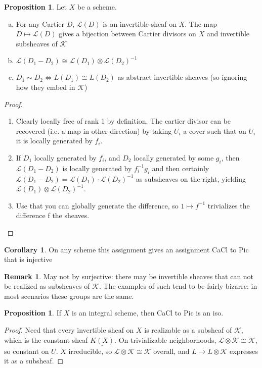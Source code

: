 \documentclass[10pt,reqno]{amsart}
\theoremstyle{definition}
\newtheorem{corollary}[theorem]{Corollary}
\newtheorem{proposition}[theorem]{Proposition}
\newtheorem{remark}[theorem]{Remark}
\theoremstyle{remark}
\numberwithin{equation}{section}
\numberwithin{theorem}{section}
\newcommand{\LL}{{\mathscr L}}
\newcommand{\KK}{{\mathscr K}}
\begin{document}
\begin{proposition} Let $X$ be a scheme.
\begin{enumerate}[(a)]
\item For any Cartier $D$, $\LL(D)$ is an invertible sheaf on $X$. The map $D \mapsto \LL(D)$ gives a bijection between Cartier divisors on $X$ and invertible subsheaves of $\KK$
\item $\LL(D_1 - D_2) \cong \LL(D_1) \otimes \LL(D_2)^{-1}$
\item $D_1 \sim D_2 \iff L(D_1) \cong L(D_2)$ as abstract invertible sheaves (so ignoring how they embed in $\KK$)
\end{enumerate}
\end{proposition}
\begin{proof}\text{ }
\begin{enumerate}
\item Clearly locally free of rank 1 by definition. The cartier divisor can be recovered (i.e. a map in other direction) by taking $U_i$ a cover such that on $U_i$ it is locally generated by $f_i$.
\item If $D_1$ locally generated by $f_i$, and $D_2$ locally generated by some $g_i$, then $\LL(D_1 - D_2)$ is locally generated by $f_i^{-1}g_i$ and then certainly $\LL(D_1 - D_2) = \LL(D_1) \cdot \LL(D_2)^{-1}$ as subsheaves on the right, yielding $\LL(D_1) \otimes \LL(D_2)^{-1}$.
\item Use that you can globally generate the difference, so $1 \mapsto f^{-1}$ trivializes the difference f the sheaves.
\end{enumerate}
\end{proof}

\begin{corollary} On any scheme this assignment gives an assignment CaCl to Pic that is injective
\end{corollary}

\begin{remark} May not by surjective: there may be invertible sheaves that can not be realized as subsheaves of $\KK$. The examples of such tend to be fairly bizarre: in most scenarios these groups are the same.
\end{remark}

\begin{proposition} If $X$ is an integral scheme, then CaCl to Pic is an iso.
\end{proposition}
\begin{proof} Need that every invertible sheaf on $X$ is realizable as a subsheaf of $\KK$, which is the constant sheaf $\underline{K(X)}$. On trivializable neighborhoods, $\LL \otimes \KK \cong \KK$, so constant on $U$. $X$ irreducible, so $\LL \otimes \KK \cong \KK$ overall, and $L \to L \otimes \KK$ expresses it as a subsheaf.
\end{proof}
\end{document}
